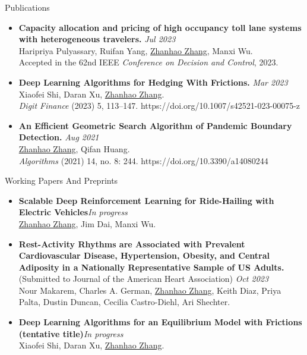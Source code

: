 \documentclass{resume} %
\begin{document}
\begin{rSection}{Publications}
\begin{itemize}
\item {\bf Capacity allocation and pricing of high occupancy toll lane systems with heterogeneous travelers.} \hfill {\em Jul 2023}\\
Haripriya Pulyassary, Ruifan Yang, \underline{Zhanhao Zhang}, Manxi Wu.\\
Accepted in the 62nd IEEE \textit{Conference on Decision and Control}, 2023.
\item {\bf Deep Learning Algorithms for Hedging With Frictions.} \hfill {\em Mar 2023}\\
Xiaofei Shi, Daran Xu, \underline{Zhanhao Zhang}.\\
\textit{Digit Finance} (2023) 5, 113–147. https://doi.org/10.1007/s42521-023-00075-z
\item {\bf An Efficient Geometric Search Algorithm of Pandemic Boundary Detection.} \hfill {\em Aug 2021}\\
\underline{Zhanhao Zhang}, Qifan Huang.\\
\textit{Algorithms} (2021) 14, no. 8: 244. https://doi.org/10.3390/a14080244
\end{itemize}
\end{rSection}

\begin{rSection}{Working Papers And Preprints}
\begin{itemize}
\item {\bf Scalable Deep Reinforcement Learning for Ride-Hailing with Electric Vehicles}\hfill {\em In progress}\\
\underline{Zhanhao Zhang}, Jim Dai, Manxi Wu.
\item {\bf Rest-Activity Rhythms are Associated with Prevalent Cardiovascular Disease, Hypertension, Obesity, and Central Adiposity in a Nationally Representative Sample of US Adults.} {(Submitted to Journal of the American Heart Association)} \hfill {\em Oct 2023}\\
Nour Makarem, Charles A. German, \underline{Zhanhao Zhang}, Keith Diaz, Priya Palta, Dustin Duncan, Cecilia Castro-Diehl, Ari Shechter.
\item {\bf Deep Learning Algorithms for an Equilibrium Model with Frictions (tentative title)}\hfill {\em In progress}\\
Xiaofei Shi, Daran Xu, \underline{Zhanhao Zhang}.
\end{itemize}
\end{rSection}
\end{document}
